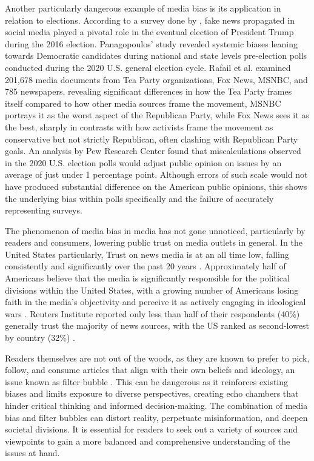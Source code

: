Another particularly dangerous example of media bias is its application in relation to elections. According to a survey done by \cite{allcott-2017-socialmedia-2016election}, fake news propagated in social media played a pivotal role in the eventual election of President Trump during the 2016 election. Panagopoulos' study \cite{panagopoulos-2020} revealed systemic biases leaning towards Democratic candidates during national and state levels pre-election polls conducted during the 2020 U.S. general election cycle. Rafail et al. \cite{rafail-2018-tea-party} examined 201,678 media documents from Tea Party organizations, Fox News, MSNBC, and 785 newspapers, revealing significant differences in how the Tea Party frames itself compared to how other media sources frame the movement, MSNBC portrays it as the worst aspect of the Republican Party, while Fox News sees it as the best, sharply in contrasts with how activists frame the movement as conservative but not strictly Republican, often clashing with Republican Party goals. An analysis by Pew Research Center \cite{pew-2021-election2020} found that miscalculations observed in the 2020 U.S. election polls would adjust public opinion on issues by an average of just under 1 percentage point. Although errors of such scale would not have produced substantial difference on the American public opinions, this shows the underlying bias within polls specifically and the failure of accurately representing surveys.

The phenomenon of media bias in media has not gone unnoticed, particularly by readers and consumers, lowering public trust on media outlets in general. In the United States particularly, Trust on news media is at an all time low, falling consistently and significantly over the past 20 years \cite{pew-2021-partisan-divides, gallup-knight-2020-american-views, reuters-2023-digital-news-report}. Approximately half of Americans believe that the media is significantly responsible for the political divisions within the United States, with a growing number of Americans losing faith in the media's objectivity and perceive it as actively engaging in ideological wars \cite{gallup-knight-2020-american-views}. Reuters Institute reported only less than half of their respondents (40\%) generally trust the majority of news sources, with the US ranked as second-lowest by country (32\%) \cite{reuters-2023-digital-news-report}.

Readers themselves are not out of the woods, as they are known to prefer to pick, follow, and consume articles that align with their own beliefs and ideology, an issue known as filter bubble \cite{lim-2018-understanding}. This can be dangerous as it reinforces existing biases and limits exposure to diverse perspectives, creating echo chambers that hinder critical thinking and informed decision-making. The combination of media bias and filter bubbles can distort reality, perpetuate misinformation, and deepen societal divisions. It is essential for readers to seek out a variety of sources and viewpoints to gain a more balanced and comprehensive understanding of the issues at hand.

